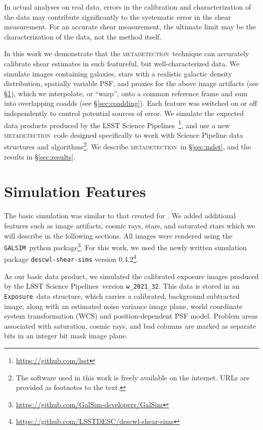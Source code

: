 \documentclass[twocolumn,twocolappendix,astrosym]{openjournal}
\newcommand{\galsim}{\texttt{GALSIM}}
\newcommand{\calexp}{\texttt{Exposure}}
\newcommand{\dm}{LSST Science Pipelines}
\newcommand{\mdet}{\textsc{metadetection}}
\begin{document}
In actual analyses on real data, errors in the calibration and characterization
of the data may contribute significantly to the systematic error in the shear
measurement.  For an accurate shear measurement, the ultimate limit may be the
characterization of the data, not the method itself.

In this work we demonstrate that the \mdet\ technique can accurately calibrate
shear estimates in such featureful, but well-characterized data.  We simulate
images containing galaxies, stars with a realistic galactic density
distribution, spatially variable PSF, and proxies for the above image artifacts
(see \S \ref{sec:sim}), which we interpolate, or ``warp'', onto a common
reference frame and sum into overlapping coadds (see \S \ref{sec:coadding}).
Each feature was switched on or off independently to control potential sources
of error.  We simulate the expected data products produced by the \dm\
\citep{BoschLSST2019,BoschHSC2017}\footnote{\url{https://github.com/lsst}}, and
use a new \mdet\ code designed specifically to work with Science Pipeline data
structures and algorithms\footnote{The software used in this work is freely
available on the internet.  URLs are provided as footnotes to the text.}.  We
describe \mdet\ in \S \ref{sec:mdet}, and the results in \S \ref{sec:results}.

\section{Simulation Features} \label{sec:sim}

The basic simulation was similar to that created for \citep{mdet20}.  We added
additional features such as image artifacts, cosmic rays, stars, and saturated
stars which we will describe in the following sections.  All images were
rendered using the \galsim\ python
package\footnote{\url{https://github.com/GalSim-developers/GalSim}}. For this work,
we used the newly written simulation package
\texttt{descwl-shear-sims} version
0.4.2\footnote{\url{https://github.com/LSSTDESC/descwl-shear-sims}}.

As our basic data product, we simulated the calibrated exposure images produced
by the \dm\ version \texttt{w\_2021\_32}.  This data is stored in an \calexp\
data structure, which carries a calibrated, background subtracted image, along
with an estimated noise variance image plane, world coordinate system
transformation (WCS) and position-dependent PSF model.  Problem areas
associated with saturation, cosmic rays, and bad columns are marked as separate
bits in an integer bit mask image plane.
\end{document}
